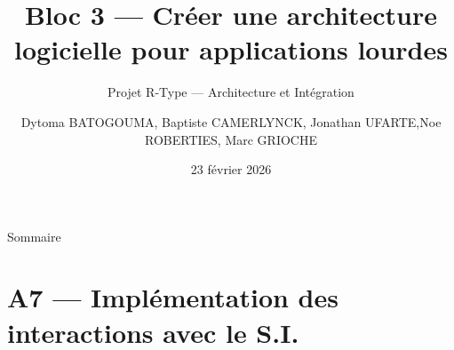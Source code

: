 \documentclass[aspectratio=169,10pt]{beamer}
\title[Bloc 3 — R-Type]{Bloc 3 — Créer une architecture logicielle pour applications lourdes}
\subtitle{Projet R-Type — Architecture et Intégration}
\author{Dytoma BATOGOUMA, Baptiste CAMERLYNCK, Jonathan UFARTE,\newline Noe ROBERTIES, Marc GRIOCHE}
\date{23 février 2026}
\begin{document}
\begin{frame}
  \titlepage
\end{frame}

\begin{frame}{Sommaire}
  \tableofcontents
\end{frame}

\section{A7 — Implémentation des interactions avec le S.I.}
\end{document}
